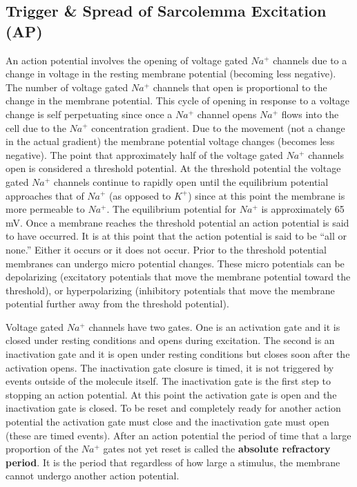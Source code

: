 \subsection{Trigger \& Spread of Sarcolemma Excitation (AP)}

An action potential involves the opening of voltage gated $Na^+$ channels due to a change in voltage in the resting membrane potential (becoming less negative). The number of voltage gated $Na^+$ channels that open is proportional to the change in the membrane potential. This cycle of opening in response to a voltage change is self perpetuating since once a $Na^+$ channel opens $Na^+$ flows into the cell due to the $Na^+$ concentration gradient. Due to the movement (not a change in the actual gradient) the membrane potential voltage changes (becomes less negative). The point that approximately half of the voltage gated $Na^+$ channels open is considered a threshold potential. At the threshold potential the voltage gated $Na^+$ channels continue to rapidly open until the equilibrium potential approaches that of $Na^+$ (as opposed to $K^+$) since at this point the membrane is more permeable to $Na^+$. The equilibrium potential for $Na^+$ is approximately 65 mV.  Once a membrane reaches the threshold potential an action potential is said to have occurred. It is at this point that the action potential is said to be “all or none.” Either it occurs or it does not occur. Prior to the threshold potential membranes can undergo micro potential changes. These micro potentials can be depolarizing (excitatory potentials that move the membrane potential toward the threshold), or hyperpolarizing (inhibitory potentials that move the membrane potential further away from the threshold potential).

Voltage gated $Na^+$ channels have two gates. One is an activation gate and it is closed under resting conditions and opens during excitation. The second is an inactivation gate and it is open under resting conditions but closes soon after the activation opens. The inactivation gate closure is timed, it is not triggered by events outside of the molecule itself. The inactivation gate is the first step to stopping an action potential. At this point the activation gate is open and the inactivation gate is closed. To be reset and completely ready for another action potential the activation gate must close and the inactivation gate must open (these are timed events). After an action potential the period of time that a large proportion of the $Na^+$ gates not yet reset is called the \textbf{absolute refractory period}. It is the period that regardless of how large a stimulus, the membrane cannot undergo another action potential. 

